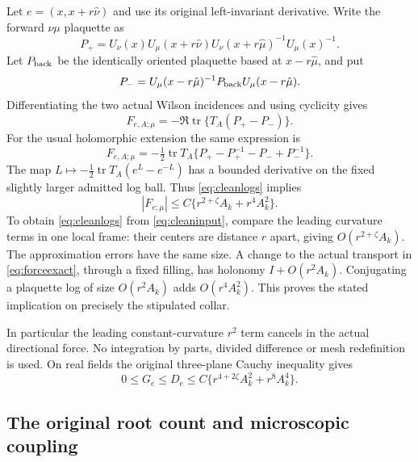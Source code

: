 \documentclass[11pt,letterpaper]{article}
\theoremstyle{remark}\newtheorem{remark}[theorem]{Remark}
\newcommand{\tr}{\operatorname{tr}}
\begin{document}
Let \(e=(x,x+r\hat\nu)\) and use its original left-invariant derivative. Write the forward \(\nu\mu\) plaquette as
\[
 P_+=U_\nu(x)U_\mu(x+r\hat\nu)
          U_\nu(x+r\hat\mu)^{-1}U_\mu(x)^{-1}.
\]
Let \(P_{\rm back}\) be the identically oriented plaquette based at \(x-r\hat\mu\), and put
\[
 P_-=U_\mu(x-r\hat\mu)^{-1}
          P_{\rm back}U_\mu(x-r\hat\mu).
\]
Differentiating the two actual Wilson incidences and using cyclicity gives
\begin{equation}\label{eq:forceexact}
 F_{e,A;\mu}=-\Re\tr\{T_A(P_+-P_-)\}.
\end{equation}
For the usual holomorphic extension the same expression is
\[
 F_{e,A;\mu}=-\tfrac12\tr T_A
   \{P_+-P_+^{-1}-P_-+P_-^{-1}\}.
\]
The map \(L\mapsto-\tfrac12\tr T_A(e^L-e^{-L})\) has a bounded derivative on the fixed slightly larger admitted log ball. Thus \eqref{eq:cleanlogs} implies
\begin{equation}\label{eq:forceclean}
 |F_{e;\mu}|\le C\{r^{2+\zeta}A_k+r^4A_k^2\}.
\end{equation}
To obtain \eqref{eq:cleanlogs} from \eqref{eq:cleaninput}, compare the leading curvature terms in one local frame: their centers are distance \(r\) apart, giving \(O(r^{2+\zeta}A_k)\). The approximation errors have the same size. A change to the actual transport in \eqref{eq:forceexact}, through a fixed filling, has holonomy \(I+O(r^2A_k)\). Conjugating a plaquette log of size \(O(r^2A_k)\) adds \(O(r^4A_k^2)\). This proves the stated implication on precisely the stipulated collar.

In particular the leading constant-curvature \(r^2\) term cancels in the actual directional force. No integration by parts, divided difference or mesh redefinition is used. On real fields the original three-plane Cauchy inequality gives
\begin{equation}\label{eq:Gclean}
 0\le G_e\le D_e\le C\{r^{4+2\zeta}A_k^2+r^8A_k^4\}.
\end{equation}

\subsection{The original root count and microscopic coupling}
\end{document}
